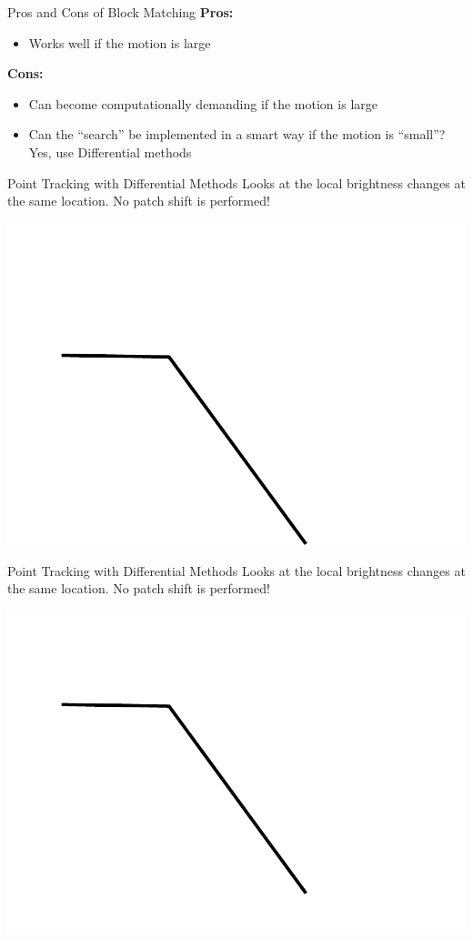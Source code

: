 \begin{frame}{Pros and Cons of Block Matching}
  \textbf{Pros:}
  \begin{itemize}
    \item Works well if the motion is large
  \end{itemize}
  
  \textbf{Cons:}
  \begin{itemize}
    \item Can become computationally demanding if the motion is large
    \item Can the “search” be implemented in a smart way if the motion is “small”?  
      Yes, use Differential methods
  \end{itemize}
\end{frame}

\begin{frame}{Point Tracking with Differential Methods}
  Looks at the local brightness changes at the same location. No patch shift is performed!
  
  \begin{center}
    \includegraphics[width=0.3\columnwidth]{./images/optical_flow/point_tracking_block_matching_1.pdf}
  \end{center}
\end{frame}

\begin{frame}{Point Tracking with Differential Methods}
  Looks at the local brightness changes at the same location. No patch shift is performed!
  
  \begin{center}
    \includegraphics[width=0.3\columnwidth]{./images/optical_flow/point_tracking_block_matching_2.pdf}
  \end{center}
\end{frame}


